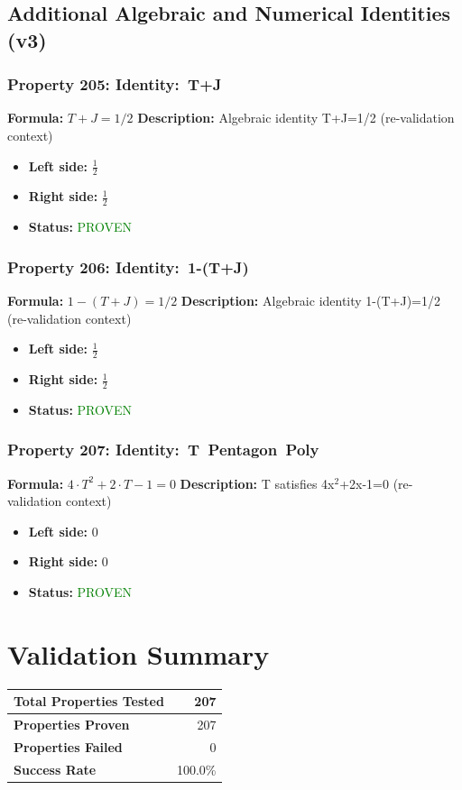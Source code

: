 \subsection{Additional Algebraic and Numerical Identities (v3)}

\subsubsection*{Property 205: Identity:~T+J}
\textbf{Formula:} $T + J = 1/2$
\textbf{Description:} Algebraic identity T+J=1/2 (re-validation context)

\begin{itemize}
\item \textbf{Left side:} $\frac{1}{2}$
\item \textbf{Right side:} $\frac{1}{2}$
\item \textbf{Status:} \textcolor{green}{PROVEN}
\end{itemize}

\subsubsection*{Property 206: Identity:~1-(T+J)}
\textbf{Formula:} $1 - (T+J) = 1/2$
\textbf{Description:} Algebraic identity 1-(T+J)=1/2 (re-validation context)

\begin{itemize}
\item \textbf{Left side:} $\frac{1}{2}$
\item \textbf{Right side:} $\frac{1}{2}$
\item \textbf{Status:} \textcolor{green}{PROVEN}
\end{itemize}

\subsubsection*{Property 207: Identity:~T~Pentagon~Poly}
\textbf{Formula:} $4 \cdot T^2 + 2 \cdot T - 1 = 0$
\textbf{Description:} T satisfies 4x$^2$+2x-1=0 (re-validation context)

\begin{itemize}
\item \textbf{Left side:} $0$
\item \textbf{Right side:} $0$
\item \textbf{Status:} \textcolor{green}{PROVEN}
\end{itemize}

\section{Validation Summary}
\begin{center}
\begin{tabular}{|l|r|}
\hline
\textbf{Total Properties Tested} & 207 \\
\hline
\textbf{Properties Proven} & 207 \\
\hline
\textbf{Properties Failed} & 0 \\
\hline
\textbf{Success Rate} & 100.0\% \\
\hline
\end{tabular}
\end{center}

